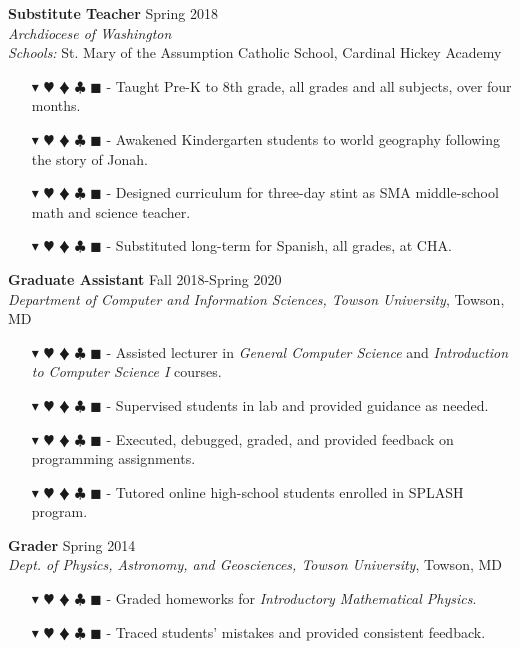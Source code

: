 \documentclass[overlapped, 10pt]{res} %
\newcommand{\physics}{$\blacktriangledown$}
\newcommand{\biochem}{$\varheartsuit$}
\newcommand{\shannon}{$\vardiamondsuit$}
\newcommand{\classic}{$\clubsuit$}
\newcommand{\quantum}{$\blacksquare$}
\newcommand{\physicscolor}{\color{YellowOrange}}
\newcommand{\biochemcolor}{\color{Emerald}}
\newcommand{\shannoncolor}{\color{Goldenrod}}
\newcommand{\classiccolor}{\color{Cyan}}
\newcommand{\quantumcolor}{\color{RedOrange}}
\newcommand{\tag}[1]{
    {\IfSubStr{#1}{\physics}{\physicscolor}{\color{White}}\physics}
    {\IfSubStr{#1}{\biochem}{\biochemcolor}{\color{White}}\biochem}
    {\IfSubStr{#1}{\shannon}{\shannoncolor}{\color{White}}\shannon}
    {\IfSubStr{#1}{\classic}{\classiccolor}{\color{White}}\classic}
    {\IfSubStr{#1}{\quantum}{\quantumcolor}{\color{White}}\quantum}
}
\begin{document}
\begin{resume}
\textbf{Substitute Teacher} \hfill Spring 2018 \\
\textit{Archdiocese of Washington} \\
\textit{Schools:} St. Mary of the Assumption Catholic School, Cardinal Hickey Academy
\begin{itemize} \itemsep -2pt %
\item[\tag{\physics\biochem\classic}-] Taught Pre-K to 8th grade, all grades and all subjects, over four months.
\item[\tag{}-] Awakened Kindergarten students to world geography following the story of Jonah.
\item[\tag{\physics\biochem}-] Designed curriculum for three-day stint as SMA middle-school math and science teacher.
\item[\tag{}-] Substituted long-term for Spanish, all grades, at CHA.
\end{itemize}

\textbf{Graduate Assistant} \hfill Fall 2018-Spring 2020 \\
\textit{Department of Computer and Information Sciences, Towson University}, Towson, MD
\begin{itemize} \itemsep -2pt %
\item[\tag{\classic}-] Assisted lecturer in \textit{General Computer Science} and \textit{Introduction to Computer Science I} courses.
\item[\tag{\classic}-] Supervised students in lab and provided guidance as needed.
\item[\tag{\classic}-] Executed, debugged, graded, and provided feedback on programming assignments.
\item[\tag{\classic}-] Tutored online high-school students enrolled in SPLASH program.
\end{itemize}

\textbf{Grader} \hfill Spring 2014 \\
\textit{Dept. of Physics, Astronomy, and Geosciences, Towson University}, Towson, MD
\begin{itemize} \itemsep -2pt %
\item[\tag{\physics}-] Graded homeworks for \textit{Introductory Mathematical Physics}.
\item[\tag{\physics}-] Traced students' mistakes and provided consistent feedback.
\end{itemize}



\end{resume}
\end{document}
